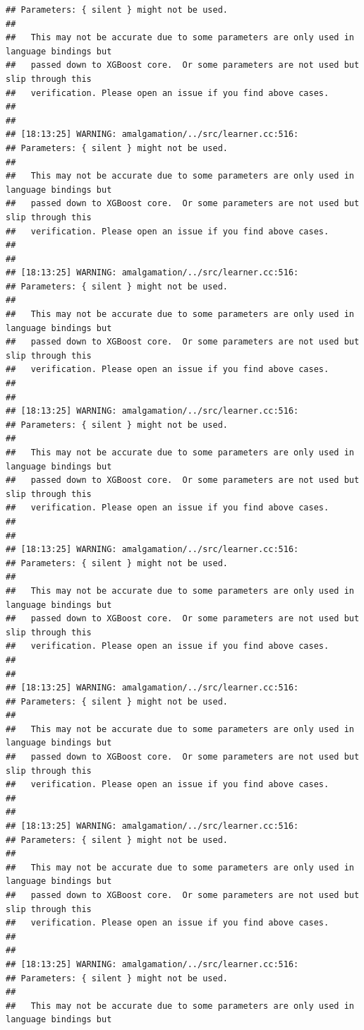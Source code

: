 \documentclass[AMS,STIX2COL]{WileyNJD-v2}\usepackage[]{graphicx}\usepackage[]{color}
\makeatletter
\newenvironment{kframe}{%
 \def\at@end@of@kframe{}%
 \ifinner\ifhmode%
  \def\at@end@of@kframe{\end{minipage}}%
  \begin{minipage}{\columnwidth}%
 \fi\fi%
 \def\FrameCommand##1{\hskip\@totalleftmargin \hskip-\fboxsep
 \colorbox{shadecolor}{##1}\hskip-\fboxsep
     \hskip-\linewidth \hskip-\@totalleftmargin \hskip\columnwidth}%
 \MakeFramed {\advance\hsize-\width
   \@totalleftmargin\z@ \linewidth\hsize
   \@setminipage}}%
 {\par\unskip\endMakeFramed%
 \at@end@of@kframe}
\newenvironment{knitrout}{}{} %
\makeatother
\begin{document}
\begin{knitrout}
\begin{kframe}
\begin{verbatim}
## Parameters: { silent } might not be used.
## 
##   This may not be accurate due to some parameters are only used in language bindings but
##   passed down to XGBoost core.  Or some parameters are not used but slip through this
##   verification. Please open an issue if you find above cases.
## 
## 
## [18:13:25] WARNING: amalgamation/../src/learner.cc:516: 
## Parameters: { silent } might not be used.
## 
##   This may not be accurate due to some parameters are only used in language bindings but
##   passed down to XGBoost core.  Or some parameters are not used but slip through this
##   verification. Please open an issue if you find above cases.
## 
## 
## [18:13:25] WARNING: amalgamation/../src/learner.cc:516: 
## Parameters: { silent } might not be used.
## 
##   This may not be accurate due to some parameters are only used in language bindings but
##   passed down to XGBoost core.  Or some parameters are not used but slip through this
##   verification. Please open an issue if you find above cases.
## 
## 
## [18:13:25] WARNING: amalgamation/../src/learner.cc:516: 
## Parameters: { silent } might not be used.
## 
##   This may not be accurate due to some parameters are only used in language bindings but
##   passed down to XGBoost core.  Or some parameters are not used but slip through this
##   verification. Please open an issue if you find above cases.
## 
## 
## [18:13:25] WARNING: amalgamation/../src/learner.cc:516: 
## Parameters: { silent } might not be used.
## 
##   This may not be accurate due to some parameters are only used in language bindings but
##   passed down to XGBoost core.  Or some parameters are not used but slip through this
##   verification. Please open an issue if you find above cases.
## 
## 
## [18:13:25] WARNING: amalgamation/../src/learner.cc:516: 
## Parameters: { silent } might not be used.
## 
##   This may not be accurate due to some parameters are only used in language bindings but
##   passed down to XGBoost core.  Or some parameters are not used but slip through this
##   verification. Please open an issue if you find above cases.
## 
## 
## [18:13:25] WARNING: amalgamation/../src/learner.cc:516: 
## Parameters: { silent } might not be used.
## 
##   This may not be accurate due to some parameters are only used in language bindings but
##   passed down to XGBoost core.  Or some parameters are not used but slip through this
##   verification. Please open an issue if you find above cases.
## 
## 
## [18:13:25] WARNING: amalgamation/../src/learner.cc:516: 
## Parameters: { silent } might not be used.
## 
##   This may not be accurate due to some parameters are only used in language bindings but

\end{verbatim}
\end{kframe}
\end{knitrout}
\end{document}
